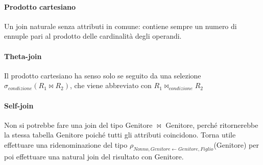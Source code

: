 \documentclass[10pt]{book}
\begin{document}
\paragraph{Prodotto cartesiano} Un join naturale senza attributi in comune: contiene sempre un numero di ennuple pari al prodotto delle cardinalità degli operandi.
\paragraph{Theta-join} Il prodotto cartesiano ha senso solo se seguito da una selezione $\sigma_{condizione}(R_1\bowtie R_2)$, che viene abbreviato con $R_1\bowtie_{condizione}R_2$
\paragraph{Self-join} Non si potrebbe fare una join del tipo Genitore $\bowtie$ Genitore, perché ritornerebbe la stessa tabella Genitore poiché tutti gli attributi coincidono. Torna utile effettuare una ridenominazione del tipo $\rho_{Nonno,Genitore\leftarrow Genitore,Figlio}$(Genitore) per poi effettuare una natural join del risultato con Genitore.
\end{document}
